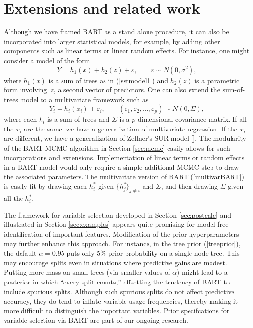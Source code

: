 \documentclass[aoas,nameyear,dvips]{arximspdf}
\let\epsilon\varepsilon
\begin{document}
\section{Extensions and related work}\label{sec:related}

Although we have framed BART as a stand alone procedure, it can
also be incorporated into larger statistical models, for example,
by adding other components such as linear terms or linear random
effects.  For instance,
one might consider a model of the form
\begin{equation}\label{h2}
Y = h_1(x)  + h_2(z) +  \epsilon, \qquad  \epsilon\sim N(0,\sigma^2),
\end{equation}
where $h_1(x)$ is a sum of trees as in (\ref{sstmodel1}) and $h_2(z)$ is a parametric form involving~$z$, a second vector of predictors.
One can also extend the sum-of-trees model to a
multivariate framework such as
\begin{equation}\label{multivarBART}
Y_i = h_i(x_i) + \epsilon_i,\qquad
(\epsilon_1,\epsilon_2,\ldots,\epsilon_p) \sim N(0,\Sigma),
\end{equation}
where each $h_i$ is a sum of trees and $\Sigma$ is a $p$ dimensional
covariance matrix.  If all the $x_i$ are the same, we have a
generalization of multivariate regression. If the $x_i$ are
different, we have a generalization of Zellner's SUR model
[\citet{Zell1962}].  The modularity of the BART MCMC algorithm in
Section \ref{sec:mcmc} easily allows for such incorporations and
extensions.  Implementation of linear terms or random effects in a
BART model would only require a simple additional MCMC step to draw
the associated parameters. The multivariate version of BART
(\ref{multivarBART}) is easily fit by drawing each $h^*_i$ given
$\{h^*_j\}_{j \ne i}$ and $\Sigma$, and then drawing $\Sigma$ given
all the $h^*_i$.


The framework for variable selection developed in Section
\ref{sec:postcalc} and illustrated in Section \ref{sec:examples}
appears quite promising for model-free identification of important
features.   Modification of the prior hyperparameters may further
enhance this approach.  For instance, in the tree prior
(\ref{treeprior}), the default $\alpha=0.95$ puts only 5\% prior
probability on a single node tree.  This may encourage splits even in
situations where predictive gains are modest.  Putting more mass on
small trees (via smaller values of $\alpha$) might lead to a posterior
in which ``every split counts,'' offsetting the tendency of BART to
include spurious splits.  Although such spurious splits do not affect
predictive accuracy, they do tend to inflate variable usage
frequencies, thereby making it more difficult to distinguish the
important variables.  Prior specifcations for variable selection via
BART are part of our ongoing research.
\end{document}

